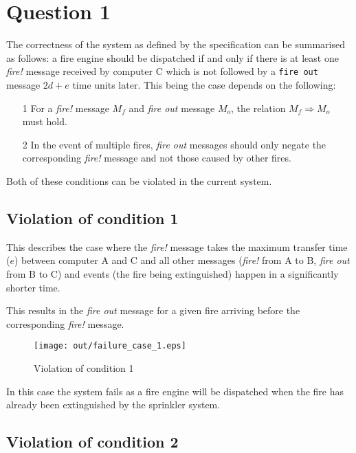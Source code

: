 \documentclass[twocolumn]{article}
\title{\DOCTITLE}
\author{\DOCAUTHOR}
\date{\DOCDATE}
\begin{document}
\section{Question 1}

The correctness of the system as defined by the specification can be summarised
as follows: a fire engine should be dispatched if and only if there is at least
one \textit{fire!} message received by computer C which is not followed by a
\texttt{fire out} message $2d + e$ time units later. This being the case depends
on the following:

\begin{enumerate}
  \item[1] For a \textit{fire!} message $M_{f}$ and \textit{fire out} message
           $M_{o}$, the relation $M_{f} \Rightarrow M_{o}$ must hold.
  \item[2] In the event of multiple fires, \textit{fire out} messages should
           only negate the corresponding \textit{fire!} message and not those
           caused by other fires.
\end{enumerate}

Both of these conditions can be violated in the current system.

\subsection{Violation of condition 1}

This describes the case where the \textit{fire!} message takes the maximum
transfer time ($e$) between computer A and C and all other messages
(\textit{fire!} from A to B, \textit{fire out} from B to C) and events (the fire
being extinguished) happen in a significantly shorter time.

This results in the \textit{fire out} message for a given fire arriving before
the corresponding \textit{fire!} message.

\begin{figure}[h!]
  \centering
  \texttt{[image: out/failure\_case\_1.eps]}
  \caption{Violation of condition 1}
  \label{fig:failure_case_1}
\end{figure}

In this case the system fails as a fire engine will be dispatched when the fire
has already been extinguished by the sprinkler system.

\subsection{Violation of condition 2}
\end{document}
